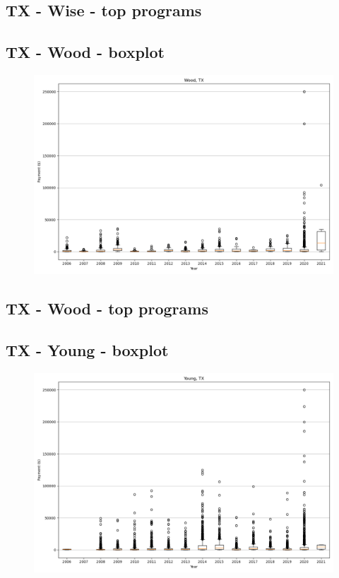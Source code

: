 \subsection*{TX - Wise - top programs}

\newpage
\subsection*{TX - Wood - boxplot}
\begin{figure}[h]
\centering
\includegraphics[width=7in]{../output/boxplots/counties/Wood-TX_boxplot.png}
\end{figure}


\subsection*{TX - Wood - top programs}

\newpage
\subsection*{TX - Young - boxplot}
\begin{figure}[h]
\centering
\includegraphics[width=7in]{../output/boxplots/counties/Young-TX_boxplot.png}
\end{figure}


